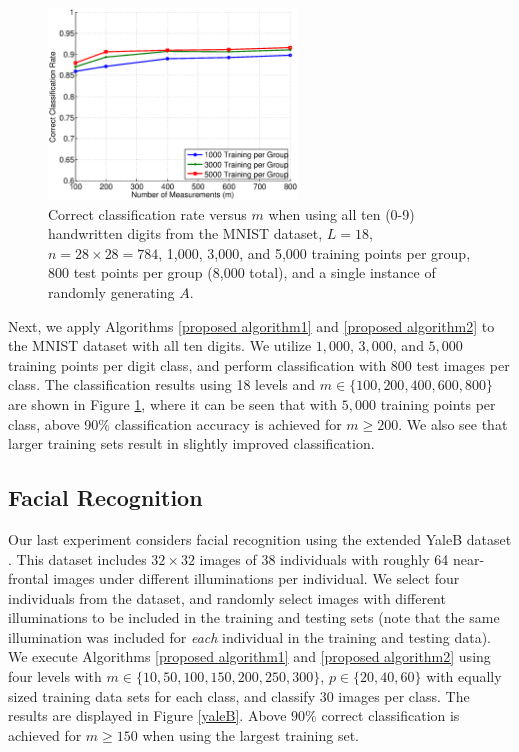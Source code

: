 \documentclass[twoside,11pt]{article}
\newcommand{\edit}[1]{{{#1}}}
\begin{document}
\begin{figure}[!htbp]
\centering
\includegraphics[height=2in]{images/MNIST/10Digits/18layers_v2/mnist_3.eps}
\caption{Correct classification rate versus $m$ when using all ten (0-9) handwritten digits from the MNIST dataset, $L=18$, $n=28\times 28=784$, 1,000, 3,000, and 5,000 training points per group, 800 test points per group (8,000 total), and a single instance of randomly generating $A$.}
\label{mnist:all}
\end{figure}

Next, we apply Algorithms \ref{proposed algorithm1} and \ref{proposed algorithm2} to the MNIST dataset with all ten digits. We utilize $1,000$, $3,000$, and $5,000$ training points per digit class, and perform classification with $800$ test images per class. The classification results using 18 \edit{level}s and $m\in\{100, 200, 400, 600, 800\}$ are shown in Figure \ref{mnist:all}, where it can be seen that with $5,000$ training points per class, above 90\% classification accuracy is achieved for $m\geq 200$. We also see that larger training sets result in slightly improved classification. 

\subsection{Facial Recognition}

Our last experiment considers facial recognition using the extended YaleB dataset \citep{CHHH07,CHH07b,CHHZ06,HYHNZ05}. This dataset  includes $32 \times 32$ images of 38 individuals with roughly 64 near-frontal images under different illuminations per individual. We select \edit{four} individuals from the dataset, and randomly select images with different illuminations to be included in the training and testing sets (note that the same illumination was included for \textit{each} individual in the training and testing data). We execute Algorithms \ref{proposed algorithm1} and \ref{proposed algorithm2} using four \edit{level}s with $m\in\{10,50,100,150,200,250,300 \}$, $p\in\{20,40,60\}$ with equally sized training data sets for each class, and classify 30 images per class. The results are displayed in Figure \ref{yaleB}. \edit{Above $90\%$ correct classification is achieved for $m\geq 150$ when using the largest training set.}
\end{document}
